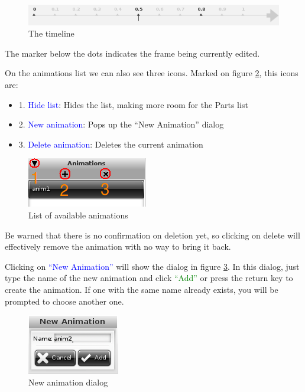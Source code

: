 \documentclass[a4paper]{profusion}
\newcommand{\GUIButton}[1]{\textcolor{green}{#1}} %
\newcommand{\GUIIcon}[1]{\textcolor{blue}{#1}}    %
\begin{document}
\begin{figure}[h!]
  \centering
  \includegraphics{images/animation_timeline.png}
  \caption{The timeline}
  \label{fig:animation_timeline}
\end{figure}

The marker below the dots indicates the frame being currently edited.

On the animations list we can also see three icons. Marked on figure
\ref{fig:animation_list}, this icons are:
\begin{itemize}
\item 1. \GUIIcon{Hide list}: Hides the list, making more room for the
  Parts list
\item 2. \GUIIcon{New animation}: Pops up the ``New Animation'' dialog
\item 3. \GUIIcon{Delete animation}: Deletes the current animation
\end{itemize}

\begin{figure}[h!]
  \centering
  \includegraphics{images/animation_list.png}
  \caption{List of available animations}
  \label{fig:animation_list}
\end{figure}

Be warned that there is no confirmation on deletion yet, so clicking
on delete will effectively remove the animation with no way to bring
it back.

Clicking on \GUIIcon{``New Animation''} will show the dialog in figure
\ref{fig:animation_dialog_new}. In this dialog, just type the name of
the new animation and click \GUIButton{``Add''} or press the return
key to create the animation. If one with the same name already exists,
you will be prompted to choose another one.

\begin{figure}[h!]
  \centering
  \includegraphics{images/animation_dialog_new.png}
  \caption{New animation dialog}
  \label{fig:animation_dialog_new}
\end{figure}
\end{document}
